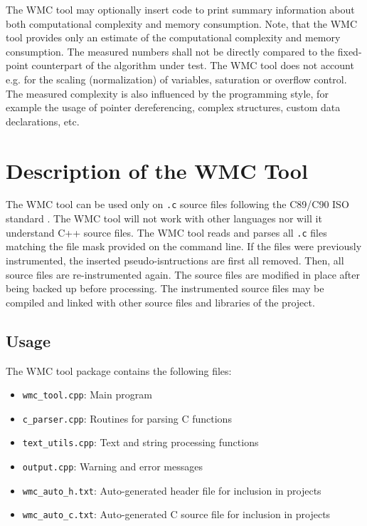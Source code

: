 The WMC tool may optionally insert code to print summary information about both computational complexity and memory consumption. Note, that the WMC tool provides only an estimate of the computational complexity and memory consumption. The measured numbers shall not be directly compared to the fixed-point counterpart of the algorithm under test. The WMC tool does not account e.g. for the scaling (normalization) of variables, saturation or overflow control. The measured complexity is also influenced by the programming style, for example the usage of pointer dereferencing, complex structures, custom data declarations, etc.

\section{Description of the WMC Tool}

The WMC tool can be used only on \verb|.c| source files following the C89/C90 ISO standard \cite{C90}. The WMC tool will not work with other languages nor will it understand C++ source files. The WMC tool reads and parses all \verb|.c| files matching the file mask provided on the command line. If the files were previously instrumented, the inserted pseudo-isntructions are first all removed. Then, all source files are re-instrumented again. The source files are modified in place  after being backed up before processing. The instrumented source files may be compiled and linked with other source files and libraries of the project.

\subsection{Usage}
\label{ch:usage_wmc_tool}

The WMC tool package contains the following files:

\begin{itemize}
    \item \verb|wmc_tool.cpp|: Main program
    \item \verb|c_parser.cpp|: Routines for parsing C functions
    \item \verb|text_utils.cpp|: Text and string processing functions
    \item \verb|output.cpp|: Warning and error messages
    \item \verb|wmc_auto_h.txt|: Auto-generated header file for inclusion in projects
    \item \verb|wmc_auto_c.txt|: Auto-generated C source file for inclusion in projects
\end{itemize}

